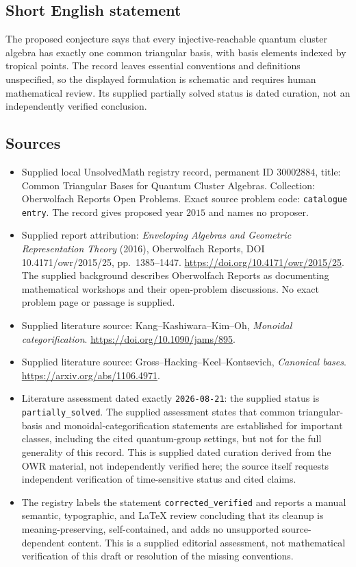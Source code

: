\documentclass[11pt]{article}
\begin{document}
\subsection{Short English statement}
The proposed conjecture says that every injective-reachable quantum cluster algebra has exactly one common triangular basis, with basis elements indexed by tropical points. The record leaves essential conventions and definitions unspecified, so the displayed formulation is schematic and requires human mathematical review. Its supplied partially solved status is dated curation, not an independently verified conclusion.
\subsection{Sources}
\begin{itemize}
\item Supplied local UnsolvedMath registry record, permanent ID \(30002884\), title: Common Triangular Bases for Quantum Cluster Algebras. Collection: Oberwolfach Reports Open Problems. Exact source problem code: \texttt{catalogue entry}. The record gives proposed year \(2015\) and names no proposer.
\item Supplied report attribution: \emph{Enveloping Algebras and Geometric Representation Theory} (2016), Oberwolfach Reports, DOI 10.4171/owr/2015/25, pp.\ 1385--1447. \url{https://doi.org/10.4171/owr/2015/25}. The supplied background describes Oberwolfach Reports as documenting mathematical workshops and their open-problem discussions. No exact problem page or passage is supplied.
\item Supplied literature source: Kang--Kashiwara--Kim--Oh, \emph{Monoidal categorification}. \url{https://doi.org/10.1090/jams/895}.
\item Supplied literature source: Gross--Hacking--Keel--Kontsevich, \emph{Canonical bases}. \url{https://arxiv.org/abs/1106.4971}.
\item Literature assessment dated exactly \texttt{2026-08-21}: the supplied status is \texttt{partially\_solved}. The supplied assessment states that common triangular-basis and monoidal-categorification statements are established for important classes, including the cited quantum-group settings, but not for the full generality of this record. This is supplied dated curation derived from the OWR material, not independently verified here; the source itself requests independent verification of time-sensitive status and cited claims.
\item The registry labels the statement \texttt{corrected\_verified} and reports a manual semantic, typographic, and LaTeX review concluding that its cleanup is meaning-preserving, self-contained, and adds no unsupported source-dependent content. This is a supplied editorial assessment, not mathematical verification of this draft or resolution of the missing conventions.
\end{itemize}
\end{document}
